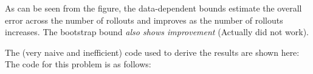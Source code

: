 \documentclass{article}[12pt]
\begin{document}
%	
%	
%

As can be seen from the figure, the data-dependent bounds estimate the overall error across the number of rollouts and improves as the number of rollouts increases.
The bootstrap bound \emph{also shows improvement} (Actually did not work).



The (very naive and inefficient) code used to derive the results are shown here:
\\ The code for this problem is as follows:



 
\end{document}
